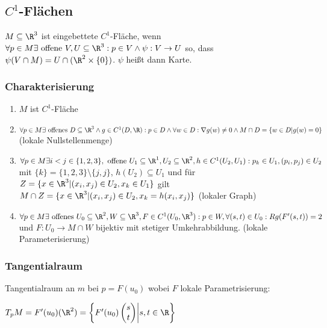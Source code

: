 \subsection*{$C^1$-Flächen}

$M \subseteq \R^3$ ist eingebettete $C^1$-Fläche, wenn $\forall p \in M \exists \text{ offene } V, U \subseteq \R^3 : p \in V \land \psi : V \rightarrow U$ so, dass $\psi(V \cap M) = U \cap (\R^2 \times \{0\})$. $\psi$ heißt dann Karte.

\subsubsection*{Charakterisierung}

\begin{enumerate}[label=(\alph*)]
	\item $M$ ist $C^1$-Fläche
	\item $\forall p \in M \exists \text{ offenes } D \subseteq \R^3 \land g \in C^1(D, \R) : \\ p \in D \land \forall w \in D : \nabla g(w) \neq 0 \land M \cap D = \{w\in D | g(w) = 0\}$ (lokale Nullstellenmenge)
	\item $\forall p \in M \exists i < j \in \{1, 2, 3\}, \text{ offene } U_1 \subseteq \R^1, U_2 \subseteq \R^2, h \in C^1(U_2, U_1) : p_k \in U_1, (p_i, p_j) \in U_2$ mit $\{k\} = \{1, 2, 3\} \setminus \{j, j\}$, $h(U_2) \subseteq U_1$ und für $Z=\{x \in \R^3 | (x_i, x_j) \in U_2, x_k \in U_1\}$ gilt $M \cap Z = \{x \in \R^3 | (x_i, x_j) \in U_2, x_k = h(x_i, x_j)\}$ (lokaler Graph)
	\item $\forall p \in M \exists \text{ offenes } U_0 \subseteq \R^2, W \subseteq \R^3, F \in C^1(U_0, \R^3) : p \in W, \forall (s, t) \in U_0 : Rg(F'(s, t)) = 2$ und $F: U_0 \rightarrow M \cap W$ bijektiv mit stetiger Umkehrabbildung. (lokale Parameterisierung)
\end{enumerate}

\subsubsection*{Tangentialraum}

Tangentialraum an $m$ bei $p=F(u_0)$ wobei $F$ lokale Parametrisierung:

$T_p M = F'(u_0)(\R^2) = \left\{ F'(u_0) \begin{pmatrix} s \\ t \end{pmatrix} \middle| s, t \in \R \right\}$

